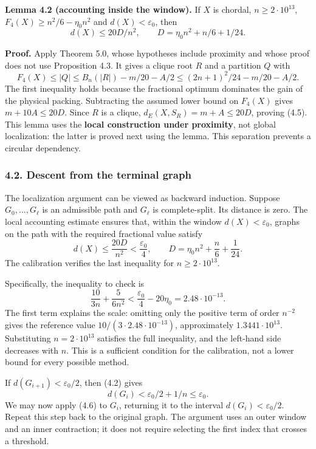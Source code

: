 \documentclass[english,11pt,a4paper]{article}
\begin{document}

\textbf{Lemma 4.2 (accounting inside the window).} If \(X\) is chordal, \(n\ge2\cdot10^{13}\), \(F_4(X)\ge n^2/6-\eta_0n^2\) and \(d(X)<\varepsilon_0\), then \[
d(X)\le20D/n^2,\qquad D=\eta_0n^2+n/6+1/24.
\tag{4.5}
\]

\textbf{Proof.} Apply Theorem 5.0, whose hypotheses include proximity and whose proof does not use Proposition 4.3. It gives a clique root \(R\) and a partition \(Q\) with \[
F_4(X)\le |Q|\le B_n(|R|)-m/20-A/2
\le (2n+1)^2/24-m/20-A/2.
\] The first inequality holds because the fractional optimum dominates the gain of the physical packing. Subtracting the assumed lower bound on \(F_4(X)\) gives \(m+10A\le20D\). Since \(R\) is a clique, \(d_E(X,S_R)=m+A\le20D\), proving (4.5). This lemma uses the \textbf{local construction under proximity}, not global localization: the latter is proved next using the lemma. This separation prevents a circular dependency.

\subsubsection{4.2. Descent from the terminal graph}\label{descent-from-the-terminal-graph}

The localization argument can be viewed as backward induction. Suppose \(G_0,\ldots,G_\ell\) is an admissible path and \(G_\ell\) is complete-split. Its distance is zero. The local accounting estimate ensures that, within the window \(d(X)<\varepsilon_0\), graphs on the path with the required fractional value satisfy \[
d(X)\le\frac{20D}{n^2}<\frac{\varepsilon_0}{4},\qquad
D=\eta_0n^2+\frac n6+\frac1{24}.
\tag{4.6}
\] The calibration verifies the last inequality for \(n\ge2\cdot10^{13}\).

Specifically, the inequality to check is \[
\frac{10}{3n}+\frac{5}{6n^2}<\frac{\varepsilon_0}{4}-20\eta_0
=2.48\cdot10^{-13}.
\tag{4.6a}
\] The first term explains the scale: omitting only the positive term of order \(n^{-2}\) gives the reference value \(10/(3\cdot2.48\cdot10^{-13})\), approximately \(1.3441\cdot10^{13}\). Substituting \(n=2\cdot10^{13}\) satisfies the full inequality, and the left-hand side decreases with \(n\). This is a sufficient condition for the calibration, not a lower bound for every possible method.

If \(d(G_{i+1})<\varepsilon_0/2\), then (4.2) gives \[
d(G_i)<\varepsilon_0/2+1/n\le\varepsilon_0.
\] We may now apply (4.6) to \(G_i\), returning it to the interval \(d(G_i)<\varepsilon_0/2\). Repeat this step back to the original graph. The argument uses an outer window and an inner contraction; it does not require selecting the first index that crosses a threshold.
\end{document}
